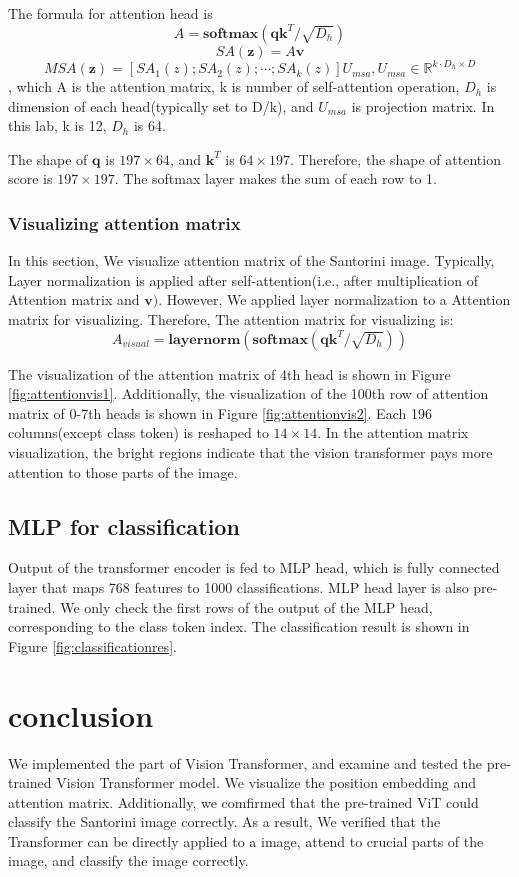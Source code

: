 \documentclass[extendedabs]{bmvc2k}
\begin{document}
The formula for attention head is
$$
A = \textbf{softmax}(\textbf{q}\textbf{k}^T / \sqrt{D_h})
$$
$$
SA(\textbf{z}) = A\textbf{v}
$$
$$
MSA(\textbf{z}) = [SA_1(z);SA_2(z);\cdots;SA_k(z)]U_{msa}, U_{msa}\in \mathbb{R}^{k\cdot D_h \times D}
$$
, which A is the attention matrix, k is number of self-attention operation, $D_h$ is dimension of each head(typically set to D/k), and $U_{msa}$ is projection matrix. In this lab, k is 12, $D_h$ is 64. 

The shape of $\textbf{q}$ is $197\times64$, and $\textbf{k}^T$ is $64\times197$. Therefore, the shape of attention score is $197\times197$. The softmax layer makes the sum of each row to 1.
\subsubsection{Visualizing attention matrix}
In this section, We visualize attention matrix of the Santorini image. Typically, Layer normalization is applied after self-attention(i.e., after multiplication of Attention matrix and $\textbf{v})$. However, We applied layer normalization to a Attention matrix for visualizing. Therefore, The attention matrix for visualizing is:
$$
A_{visual} = \textbf{layernorm}(\textbf{softmax}(\textbf{q}\textbf{k}^T / \sqrt{D_h}))
$$

The visualization of the attention matrix of 4th head is shown in Figure \ref{fig:attentionvis1}. Additionally, the visualization of the 100th row of attention matrix of 0-7th heads is shown in Figure \ref{fig:attentionvis2}. Each 196 columns(except class token) is reshaped to $14\times14$. In the attention matrix visualization, the bright regions indicate that the vision transformer pays more attention to those parts of the image.

\subsection{MLP for classification}
Output of the transformer encoder is fed to MLP head, which is fully connected layer that maps 768 features to 1000 classifications. MLP head layer is also pre-trained. We only check the first rows of the output of the MLP head, corresponding to the class token index. The classification result is shown in Figure \ref{fig:classificationres}.

\section{conclusion}
We implemented the part of Vision Transformer\cite{vit}, and examine and tested the pre-trained Vision Transformer model. We visualize the position embedding and attention matrix. Additionally, we comfirmed that the pre-trained ViT could classify the Santorini image correctly. As a result, We verified that the Transformer\cite{transformer} can be directly applied to a image, attend to crucial parts of the image, and classify the image correctly.
\end{document}
